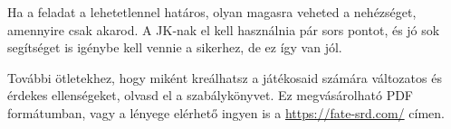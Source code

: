 Ha a feladat a lehetetlennel határos, olyan magasra veheted a nehézséget, amennyire csak akarod. A JK‑nak el kell használnia pár sors pontot, és jó sok segítséget is igénybe kell vennie a sikerhez, de ez így van jól.

További ötletekhez, hogy miként kreálhatsz a játékosaid számára változatos és érdekes ellenségeket, olvasd el a  szabálykönyvet. Ez megvásárolható PDF formátumban, vagy a lényege elérhető ingyen is a \url{https://fate-srd.com/} címen.
